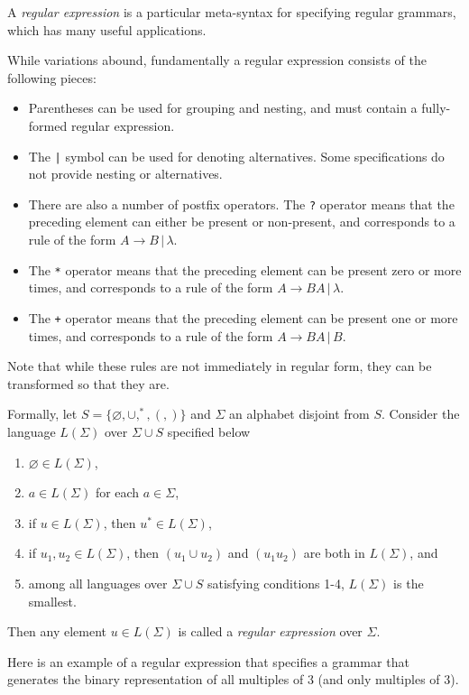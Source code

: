 \documentclass[12pt]{article}
\begin{document}
A \emph{regular expression} is a particular meta-syntax for specifying regular grammars, which has many useful applications.

While variations abound, fundamentally a regular expression consists of the following pieces:
\begin{itemize}
\item Parentheses can be used for grouping and nesting, and must contain a fully-formed regular expression.  
\item The \verb=|= symbol can be used for denoting alternatives.  Some specifications do not provide nesting or alternatives.  
\item There are also a number of postfix operators.  The \verb=?= operator means that the preceding element can either be present or non-present, and corresponds to a rule of the form $A\to B\,|\,\lambda$.  
\item The \verb=*= operator means that the preceding element can be present zero or more times, and corresponds to a rule of the form $A\to BA\,|\,\lambda$.  
\item The \verb=+= operator means that the preceding element can be present one or more times, and corresponds to a rule of the form $A\to BA\,|\,B$.  
\end{itemize}
Note that while these rules are not immediately in regular form, they can be transformed so that they are.

Formally, let $S=\lbrace \varnothing, \cup, ^*, (, )\rbrace$ and $\Sigma$ an alphabet disjoint from $S$.  Consider the language $L(\Sigma)$ over $\Sigma\cup S$ specified below
\begin{enumerate}
\item $\varnothing\in L(\Sigma)$, 
\item $a\in L(\Sigma)$ for each $a\in \Sigma$,
\item if $u\in L(\Sigma)$, then $u^*\in L(\Sigma)$,
\item if $u_1,u_2\in L(\Sigma)$, then $(u_1\cup u_2)$ and $(u_1u_2)$ are both in $L(\Sigma)$, and
\item among all languages over $\Sigma\cup S$ satisfying conditions 1-4, $L(\Sigma)$ is the smallest.
\end{enumerate}
Then any element $u\in L(\Sigma)$ is called a \emph{regular expression} over $\Sigma$.


Here is an example of a regular expression that specifies a grammar that generates the binary representation of all multiples of 3 (and only multiples of 3).
\end{document}
